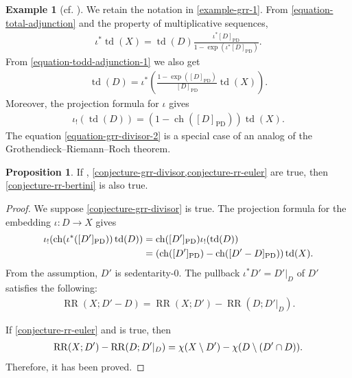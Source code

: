 \documentclass[a4paper,dvipdfmx,reqno,12pt]{amsart}
\theoremstyle{definition}
\newtheorem{example}[theorem]{Example}
\newtheorem{proposition}[theorem]{Proposition}
\newcommand{\opn}[1]{\operatorname{#1}}
\newcommand{\PD}[1]{[#1]_{\mathrm{PD}}}
\numberwithin{equation}{section}
\begin{document}
\begin{example}[{cf. \cite[Chapter 13 Appendix]{MR2810322}}]
We retain the notation in \cref{example-grr-1}.
From \eqref{equation-total-adjunction}
and the property of multiplicative sequences, 
\begin{align}
\label{equation-todd-adjunction-1}
\iota^{*}\opn{td}(X)=
\opn{td}(D)\frac{\iota^{*}\PD{D}}
{1-\opn{exp}(\iota^{*}\PD{D})}.
\end{align}
From \cref{equation-todd-adjunction-1} we also get
\begin{align}
\opn{td}(D)
=\iota^{*}\left(
\frac{1-\opn{exp}(\PD{D})}{
\PD{D}}\opn{td}(X)\right).
\end{align}
Moreover, the projection formula for 
$\iota$ gives
\begin{align}
\label{equation-grr-divisor-2}
\iota_!(\opn{td}(D))=(1-\opn{ch}(\PD{D}))\opn{td}(X).
\end{align}
The equation \eqref{equation-grr-divisor-2} 
is a special case of an analog of 
the Grothendieck--Riemann--Roch theorem.
\end{example}

\begin{proposition}
If \label{proposition-euler-to-bertini}
\cite[Conjecture 6.13]{demedrano2023chern},
\cref{conjecture-grr-divisor,conjecture-rr-euler}
are true, then \cref{conjecture-rr-bertini} is also true. 
\end{proposition}

\begin{proof}
We suppose \cref{conjecture-grr-divisor} is true.
The projection formula for 
the embedding $\iota\colon D\to X$ gives
\begin{align}
\iota_!(\opn{ch}(\iota^{*}(\PD{D'}))\opn{td}(D))
&=\opn{ch}(\PD{D'})\iota_!(\opn{td}(D)) \notag \\
&=(\opn{ch}(\PD{D'})-\opn{ch}(\PD{D'-D}))\opn{td}(X).
\end{align}
From the assumption, 
$D'$ is sedentarity-$0$. 
The pullback $\iota^{*}D'=D'|_{D}$ of $D'$ satisfies
the following:
\begin{align}
\label{equation-rr-number-divisor}
\opn{RR}(X;D'-D)=\opn{RR}(X;D')-
\opn{RR}(D;D'|_{D}).
\end{align}

If \cref{conjecture-rr-euler} and 
\cite[Conjecture 6.13]{demedrano2023chern} is true,
then
\begin{align}
\opn{RR}(X;D')-
\opn{RR}(D;D'|_{D})=
\chi(X\setminus D')-\chi(D\setminus (D'\cap D)). \notag
\end{align}
Therefore, it has been proved.
\end{proof}
\end{document}
